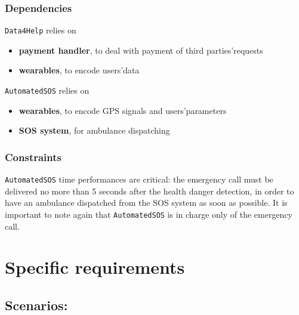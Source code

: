 \documentclass[12pt]{article}
\begin{document}
    \subsubsection{Dependencies}

      \texttt{Data4Help} relies on
      \begin{itemize}
        \item \textbf{payment handler}, to deal with payment of third parties'requests
        \item \textbf{wearables}, to encode users'data
      \end{itemize}
      \texttt{AutomatedSOS} relies on
      \begin{itemize}
        \item \textbf{wearables}, to encode GPS signals and users'parameters
        \item \textbf{SOS system}, for ambulance dispatching
      \end{itemize}

    \subsubsection{Constraints}

      \texttt{AutomatedSOS} time performances are critical: the emergency call must be delivered no more than 5 seconds after the health danger detection, in order to have an ambulance dispatched from the SOS system as soon as possible. It is important to note again that \texttt{AutomatedSOS} is in charge only of the emergency call.

\clearpage
\section{Specific requirements}
\label{sec:specreq}

\subsection{Scenarios:}
\end{document}
